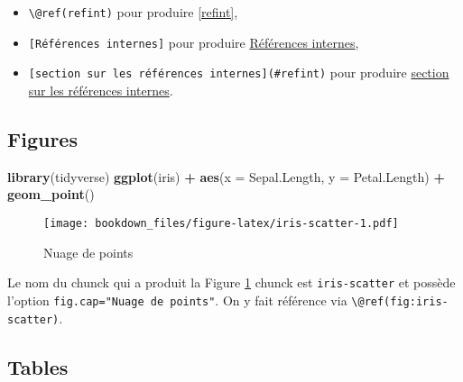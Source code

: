 \documentclass[]{book}
\newenvironment{Shaded}{\begin{snugshade}}{\end{snugshade}}
\newcommand{\CommentTok}[1]{\textcolor[rgb]{0.56,0.35,0.01}{\textit{#1}}}
\newcommand{\DataTypeTok}[1]{\textcolor[rgb]{0.13,0.29,0.53}{#1}}
\newcommand{\KeywordTok}[1]{\textcolor[rgb]{0.13,0.29,0.53}{\textbf{#1}}}
\newcommand{\NormalTok}[1]{#1}
\newcommand{\OperatorTok}[1]{\textcolor[rgb]{0.81,0.36,0.00}{\textbf{#1}}}
\newcommand{\StringTok}[1]{\textcolor[rgb]{0.31,0.60,0.02}{#1}}
\theoremstyle{definition}
\theoremstyle{definition}
\theoremstyle{definition}
\theoremstyle{remark}
\begin{document}
\begin{itemize}
\item
  \texttt{\textbackslash{}@ref(refint)} pour produire \ref{refint},
\item
  \texttt{{[}Références\ internes{]}} pour produire \protect\hyperlink{refint}{Références internes},
\item
  \texttt{{[}section\ sur\ les\ références\ internes{]}(\#refint)} pour produire \protect\hyperlink{refint}{section sur les références internes}.
\end{itemize}

\hypertarget{figures}{%
\subsection{Figures}\label{figures}}

\begin{Shaded}
\begin{Highlighting}[]
\KeywordTok{library}\NormalTok{(tidyverse)}
\KeywordTok{ggplot}\NormalTok{(iris) }\OperatorTok{+}
\StringTok{  }\KeywordTok{aes}\NormalTok{(}\DataTypeTok{x =}\NormalTok{ Sepal.Length, }\DataTypeTok{y =}\NormalTok{ Petal.Length) }\OperatorTok{+}
\StringTok{  }\KeywordTok{geom_point}\NormalTok{()}
\end{Highlighting}
\end{Shaded}

\begin{figure}
\centering
\texttt{[image: bookdown\_files/figure-latex/iris-scatter-1.pdf]}
\caption{\label{fig:iris-scatter}Nuage de points}
\end{figure}

Le nom du chunck qui a produit la Figure \ref{fig:iris-scatter} chunck est \texttt{iris-scatter} et possède l'option \texttt{fig.cap="Nuage\ de\ points"}. On y fait référence via \texttt{\textbackslash{}@ref(fig:iris-scatter)}.

\hypertarget{tables}{%
\subsection{Tables}\label{tables}}

\begin{Shaded}
\end{Shaded}
\end{document}
